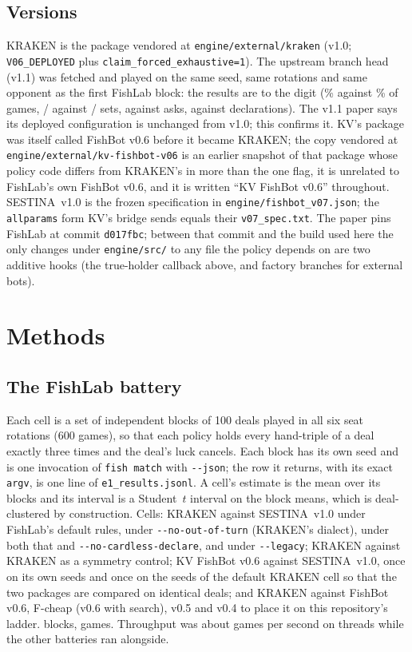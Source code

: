 \documentclass[11pt]{article}
\newcommand{\code}[1]{\texttt{#1}}
\newcommand{\flag}[1]{\texttt{-{}-#1}}
\newcommand{\sestina}{\mbox{SESTINA v1.0}}
\newcommand{\pct}{\%}
\begin{document}
\subsection{Versions}

KRAKEN is the package vendored at \code{engine/external/kraken} (v1.0; \code{V06\_DEPLOYED} plus
\code{claim\_forced\_exhaustive=1}). The upstream branch head \code{\kcUpstreamHead} (v1.1) was fetched
and played on the same seed, same rotations and same opponent as the first FishLab block: the results
are \kcIdIdentical{} to the digit (\kcIdUpWin\pct{} against \kcIdWin\pct{} of games,
\kcIdUpSetsA/\kcIdUpSetsB{} against \kcIdSetsA/\kcIdSetsB{} sets, \kcIdUpAsks{} against \kcIdAsks{}
asks, \kcIdUpDecl{} against \kcIdDecl{} declarations). The v1.1 paper says its deployed configuration is
unchanged from v1.0; this confirms it. KV's package was itself called FishBot v0.6 before it became
KRAKEN; the copy vendored at \code{engine/external/kv-fishbot-v06} is an earlier snapshot of that
package whose policy code differs from KRAKEN's in more than the one flag, it is unrelated to FishLab's
own FishBot v0.6, and it is written ``KV FishBot v0.6'' throughout. \sestina{} is the frozen specification in
\code{engine/fishbot\_v07.json}; the \code{allparams} form KV's bridge sends equals their
\code{v07\_spec.txt}. The paper pins FishLab at commit \code{d017fbc}; between that commit and the build
used here the only changes under \code{engine/src/} to any file the policy depends on are two additive
hooks (the true-holder callback above, and factory branches for external bots).

\section{Methods}
\label{sec:methods}

\subsection{The FishLab battery}
\label{sec:m-fishlab}

Each cell is a set of independent blocks of 100 deals played in all six seat rotations (600 games), so
that each policy holds every hand-triple of a deal exactly three times and the deal's luck cancels.
Each block has its own seed and is one invocation of \code{fish match} with \flag{json}; the row it
returns, with its exact \code{argv}, is one line of \code{e1\_results.jsonl}. A cell's estimate is the
mean over its blocks and its interval is a Student~$t$ interval on the block means, which is
deal-clustered by construction. Cells: KRAKEN against \sestina{} under FishLab's default rules, under
\flag{no-out-of-turn} (KRAKEN's dialect), under both that and \flag{no-cardless-declare}, and
under \flag{legacy}; KRAKEN against KRAKEN as a symmetry control; KV FishBot v0.6 against \sestina{}, once on its own seeds and once on the seeds of the default
KRAKEN cell so that the two packages are compared on identical deals; and KRAKEN against FishBot v0.6,
F-cheap (v0.6 with search), v0.5 and v0.4 to place it on this repository's ladder. \kcETotalBlocks{} blocks, \kcETotalGames{} games. Throughput was
about \kcEThroughput{} games per second on \kcEThreads{} threads while the other batteries ran
alongside.
\end{document}
